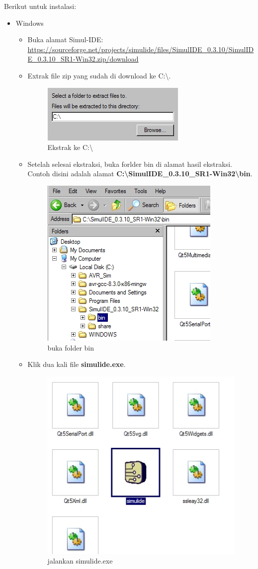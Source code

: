 \documentclass[12pt,]{article}
\begin{document}
	Berikut untuk instalasi:
	\begin{itemize}
		\item Windows
		\begin{itemize}
			\item Buka alamat Simul-IDE:\\
			\url{https://sourceforge.net/projects/simulide/files/SimulIDE_0.3.10/SimulIDE_0.3.10_SR1-Win32.zip/download}

			\item Extrak file zip yang sudah di download ke C:\textbackslash.
			\begin{figure}[H]
				\centering
				\includegraphics[width=0.35\linewidth]{images/simulide_0a}
				\caption{Ekstrak ke C:\textbackslash}
			\end{figure}

			\item Setelah selesai ekstraksi, buka forlder bin di alamat hasil ekstraksi.
			Contoh disini adalah alamat \textbf{C:\textbackslash SimulIDE\_0.3.10\_SR1-Win32\textbackslash bin}.

			\begin{figure}[H]
				\centering
				\includegraphics[width=0.35\linewidth]{images/simulide_0b}
				\caption{buka folder bin}
			\end{figure}

			\newpage
			\item Klik dua kali file \textbf{simulide.exe}.
			\begin{figure}[H]
				\centering
				\includegraphics[width=0.35\linewidth]{images/simulide_0c}
				\caption{jalankan simulide.exe}
			\end{figure}


\end{itemize}
\end{itemize}
\end{document}
